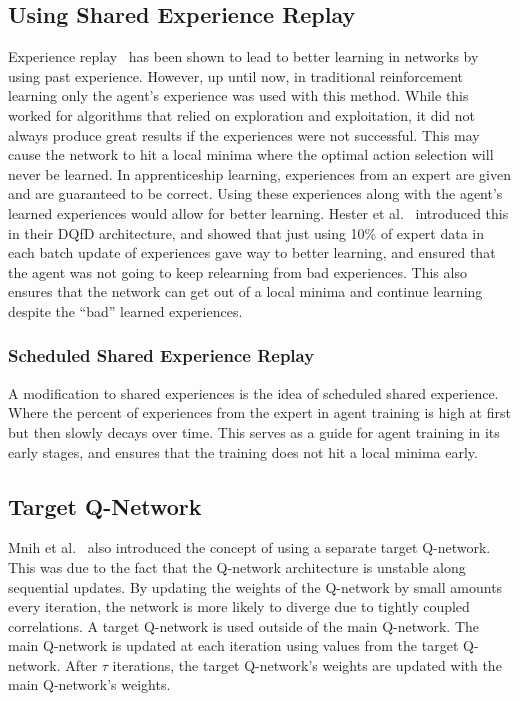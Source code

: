 \documentclass[12pt,american]{report}
\begin{document}
\subsection{Using Shared Experience Replay}
Experience replay~\cite{atari} has been shown to lead to better learning in networks by using past experience.  However, up until now, in traditional reinforcement learning only the agent's experience was used with this method.  While this worked for algorithms that relied on exploration and exploitation, it did not always produce great results if the experiences were not successful. This may cause the network to hit a local minima where the optimal action selection will never be learned. In apprenticeship learning, experiences from an expert are given and are guaranteed to be correct.  Using these experiences along with the agent's learned experiences would allow for better learning.  Hester et al.~\cite{hester2017learning} introduced this in their DQfD architecture, and showed that just using 10\% of expert data in each batch update of experiences gave way to better learning, and ensured that the agent was not going to keep relearning from bad experiences.  This also ensures that the network can get out of a local minima and continue learning despite the ``bad'' learned experiences.
\subsubsection{Scheduled Shared Experience Replay}
A modification to shared experiences is the idea of scheduled shared experience.  Where the percent of experiences from the expert in agent training is high at first but then slowly decays over time.  This serves as a guide for agent training in its early stages, and ensures that the training does not hit a local minima early. 


\subsection{Target Q-Network}
Mnih et al.~\cite{atari} also introduced the concept of using a separate target Q-network.  This was due to the fact that the Q-network architecture is unstable along sequential updates.  By updating the weights of the Q-network by small amounts every iteration, the network is more likely to diverge due to tightly coupled correlations.  A target Q-network is used outside of the main Q-network.  The main Q-network is updated at each iteration using values from the target Q-network.  After $\tau$ iterations, the target Q-network's weights are updated with the main Q-network's weights. 
\end{document}
